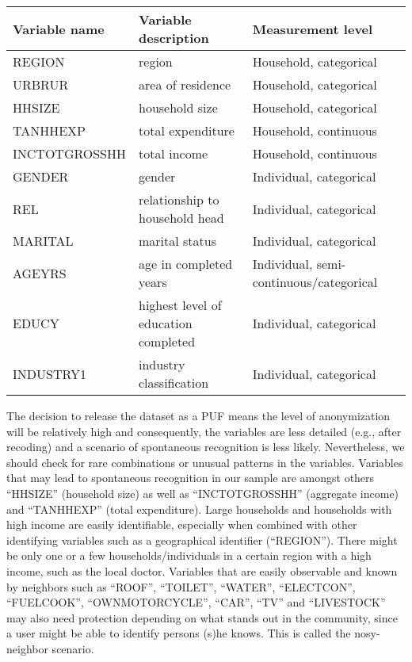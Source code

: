 \documentclass[letterpaper,10pt,english]{sphinxmanual}
\begin{document}
\begin{savenotes}\sphinxattablestart
\centering
{}
\label{\detokenize{case_studies:tab919}}\label{\detokenize{case_studies:id34}}
\sphinxaftercaption
\begin{tabulary}{\linewidth}[t]{|T|T|T|}
\hline
\sphinxstyletheadfamily 
Variable name
&\sphinxstyletheadfamily 
Variable description
&\sphinxstyletheadfamily 
Measurement level
\\
\hline
REGION
&
region
&
Household,
categorical
\\
\hline
URBRUR
&
area of residence
&
Household,
categorical
\\
\hline
HHSIZE
&
household size
&
Household,
categorical
\\
\hline
TANHHEXP
&
total expenditure
&
Household, continuous
\\
\hline
INCTOTGROSSHH
&
total income
&
Household, continuous
\\
\hline
GENDER
&
gender
&
Individual,
categorical
\\
\hline
REL
&
relationship to
household head
&
Individual,
categorical
\\
\hline
MARITAL
&
marital status
&
Individual,
categorical
\\
\hline
AGEYRS
&
age in completed
years
&
Individual,
semi-continuous/categorical
\\
\hline
EDUCY
&
highest level of
education completed
&
Individual,
categorical
\\
\hline
INDUSTRY1
&
industry
classification
&
Individual,
categorical
\\
\hline
\end{tabulary}
\par
\sphinxattableend\end{savenotes}

The decision to release the dataset as a PUF means the level of
anonymization will be relatively high and consequently, the variables
are less detailed (e.g., after recoding) and a scenario of spontaneous
recognition is less likely. Nevertheless, we should check for rare
combinations or unusual patterns in the variables. Variables that may
lead to spontaneous recognition in our sample are amongst others
“HHSIZE” (household size) as well as “INCTOTGROSSHH” (aggregate income)
and “TANHHEXP” (total expenditure). Large households and households with
high income are easily identifiable, especially when combined with other
identifying variables such as a geographical identifier (“REGION”).
There might be only one or a few households/individuals in a certain
region with a high income, such as the local doctor. Variables that are
easily observable and known by neighbors such as “ROOF”, “TOILET”,
“WATER”, “ELECTCON”, “FUELCOOK”, “OWNMOTORCYCLE”, “CAR”, “TV” and
“LIVESTOCK” may also need protection depending on what stands out in the
community, since a user might be able to identify persons (s)he knows.
This is called the nosy-neighbor scenario.
\end{document}
